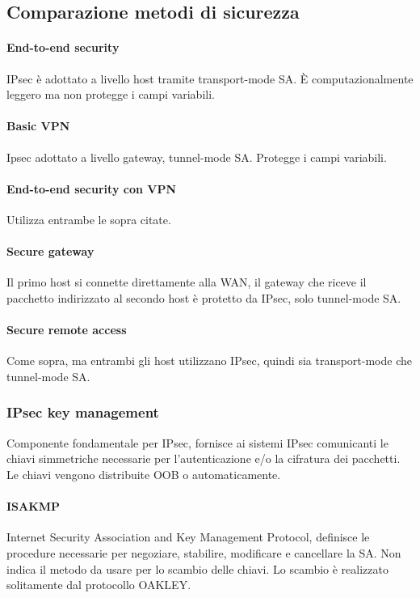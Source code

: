 \documentclass[11pt]{article}
\begin{document}
\subsection{Comparazione metodi di sicurezza}
\paragraph*{End-to-end security}
IPsec è adottato a livello host tramite transport-mode SA. È computazionalmente leggero ma non protegge i campi variabili.
\paragraph*{Basic VPN}
Ipsec adottato a livello gateway, tunnel-mode SA. Protegge i campi variabili.
\paragraph*{End-to-end security con VPN}
Utilizza entrambe le sopra citate.
\paragraph*{Secure gateway}
Il primo host si connette direttamente alla WAN, il gateway che riceve il pacchetto indirizzato al secondo host è protetto 
da IPsec, solo tunnel-mode SA.
\paragraph*{Secure remote access}
Come sopra, ma entrambi gli host utilizzano IPsec, quindi sia transport-mode che tunnel-mode SA.
\subsubsection{IPsec key management}
Componente fondamentale per IPsec, fornisce ai sistemi IPsec comunicanti le chiavi simmetriche necessarie per l'autenticazione 
e/o la cifratura dei pacchetti. Le chiavi vengono distribuite OOB o automaticamente.
\paragraph*{ISAKMP}
Internet Security Association and Key Management Protocol, definisce le procedure necessarie per negoziare, stabilire, modificare 
e cancellare la SA. Non indica il metodo da usare per lo scambio delle chiavi. Lo scambio è realizzato solitamente dal 
protocollo OAKLEY.
\end{document}
